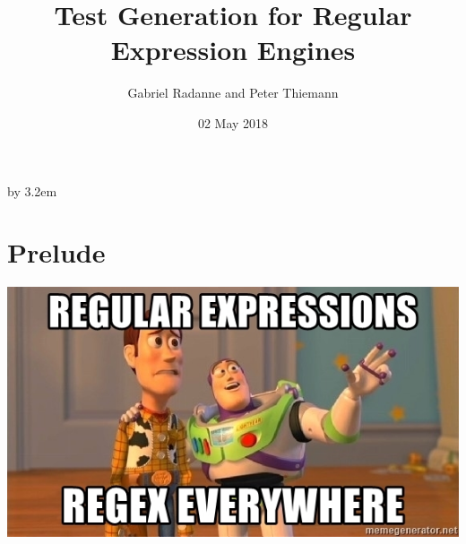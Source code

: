 \documentclass[pdftex]{beamer}
\begin{document}
\everymath{\displaystyle}


\title{Test Generation for Regular Expression Engines}
\author[Thiemann]%
{Gabriel Radanne and Peter Thiemann}
\date[2018-05-02]{02 May 2018}

\makeatletter
\begin{frame}[plain,label=fp]
    \advance\textwidth by 3.2em\relax
    \begin{minipage}{\textwidth}\par%
      \maketitle
    \end{minipage}
    \hspace*{2.5em}%
\end{frame}
\makeatother 

\section{Prelude}

\begin{frame}
    \begin{center}
      \includegraphics[scale=0.8]{regular-expressions-regex-everywhere}
    \end{center}
\end{frame}
\end{document}
